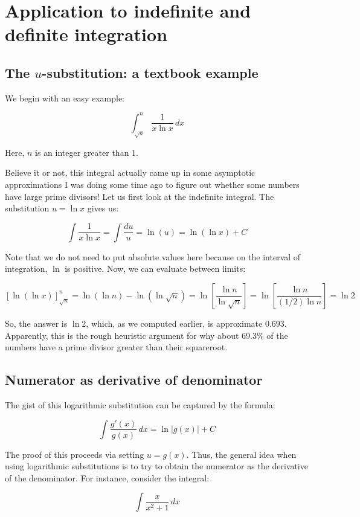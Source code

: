 \documentclass[10pt]{amsart}
\begin{document}
\section{Application to indefinite and definite integration}

\subsection{The $u$-substitution: a textbook example}

We begin with an easy example:

$$\int_{\sqrt{n}}^n \frac{1}{x \ln x} \, dx$$

Here, $n$ is an integer greater than $1$.

Believe it or not, this integral actually came up in some asymptotic
approximations I was doing some time ago to figure out whether some
numbers have large prime divisors! Let us first look at the indefinite
integral. The substitution $u = \ln x$ gives us:

$$\int \frac{1}{x \ln x} = \int \frac{du}{u} = \ln(u) = \ln(\ln x) + C$$

Note that we do not need to put absolute values here because on the
interval of integration, $\ln$ is positive. Now, we can evaluate
between limits:

$$\left[ \ln(\ln x) \right]_{\sqrt{n}}^n = \ln(\ln n) - \ln (\ln \sqrt{n}) = \ln \left[\frac{\ln n}{\ln \sqrt{n}}\right] = \ln \left[\frac{\ln n}{(1/2)\ln n}\right] = \ln 2$$

So, the answer is $\ln 2$, which, as we computed earlier, is
approximate $0.693$. Apparently, this is the rough heuristic argument
for why about $69.3 \%$ of the numbers have a prime divisor greater
than their squareroot.

\subsection{Numerator as derivative of denominator}

The gist of this logarithmic substitution can be captured by the formula:

$$\int \frac{g'(x)}{g(x)} \, dx = \ln|g(x)| + C$$

The proof of this proceeds via setting $u = g(x)$. Thus, the general
idea when using logarithmic substitutions is to try to obtain the
numerator as the derivative of the denominator. For instance, consider
the integral:

$$\int \frac{x}{x^2 + 1} \, dx$$
\end{document}
